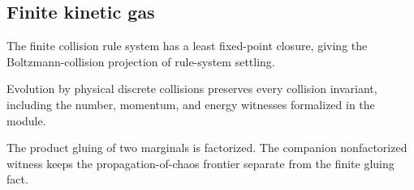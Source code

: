 \subsection{Finite kinetic gas}

\begin{theorem}\label{thm:finite-boltzmann-collision-lfp}\leanok{}
The finite collision rule system has a least fixed-point closure, giving the
Boltzmann-collision projection of rule-system settling.
\end{theorem}

\begin{theorem}\label{thm:discrete-collision-conservation}\leanok{}
Evolution by physical discrete collisions preserves every collision invariant,
including the number, momentum, and energy witnesses formalized in the module.
\end{theorem}

\begin{theorem}\label{thm:molecular-chaos-factorization}\leanok{}
The product gluing of two marginals is factorized. The companion
nonfactorized witness keeps the propagation-of-chaos frontier separate from
the finite gluing fact.
\end{theorem}
